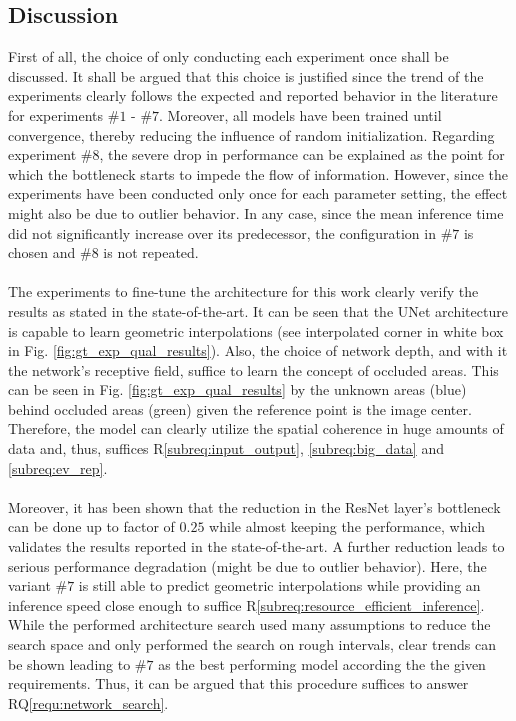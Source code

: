 \subsection{Discussion}
\label{subsec:discussion_unet_arch}
First of all, the choice of only conducting each experiment once shall be discussed. It shall be argued that this choice is justified since the trend of the experiments clearly follows the expected and reported behavior in the literature for experiments $\#1$ - $\#7$. Moreover, all models have been trained until convergence, thereby reducing the influence of random initialization. Regarding experiment $\#8$, the severe drop in performance can be explained as the point for which the bottleneck starts to impede the flow of information. However, since the experiments have been conducted only once for each parameter setting, the effect might also be due to outlier behavior. In any case, since the mean inference time did not significantly increase over its predecessor, the configuration in $\#7$ is chosen and $\#8$ is not repeated.  
\\\\
The experiments to fine-tune the architecture for this work clearly verify the results as stated in the state-of-the-art. It can be seen that the UNet architecture is capable to learn geometric interpolations (see interpolated corner in white box in Fig. \ref{fig:gt_exp_qual_results}). Also, the choice of network depth, and with it the network's receptive field, suffice to learn the concept of occluded areas. This can be seen in Fig. \ref{fig:gt_exp_qual_results} by the unknown areas (blue) behind occluded areas (green) given the reference point is the image center. Therefore, the model can clearly utilize the spatial coherence in huge amounts of data and, thus, suffices R\ref{subreq:input_output}, \ref{subreq:big_data} and \ref{subreq:ev_rep}.
\\\\
Moreover, it has been shown that the reduction in the ResNet layer's bottleneck can be done up to factor of $0.25$ while almost keeping the performance, which validates the results reported in the state-of-the-art. A further reduction leads to serious performance degradation (might be due to outlier behavior). Here, the variant $\#7$ is still able to predict geometric interpolations while providing an inference speed close enough to suffice R\ref{subreq:resource_efficient_inference}. While the performed architecture search used many assumptions to reduce the search space and only performed the search on rough intervals, clear trends can be shown leading to $\#7$ as the best performing model according the the given requirements. Thus, it can be argued that this procedure suffices to answer RQ\ref{requ:network_search}.
%
